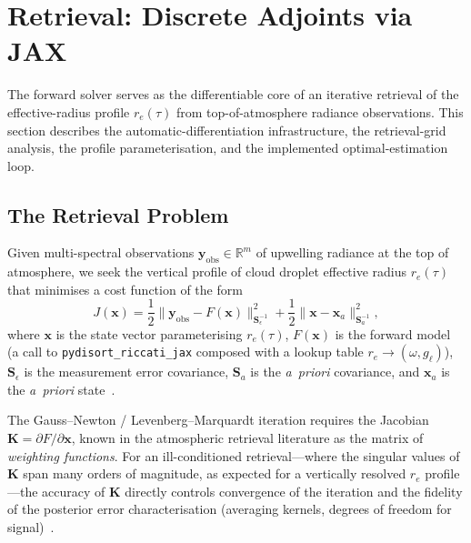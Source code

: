 \documentclass[11pt,a4paper]{article}
\newcommand{\R}{\mathbb{R}}
\newcommand{\vect}[1]{\bm{#1}}
\newcommand{\mat}[1]{\mathbf{#1}}
\theoremstyle{definition}
\begin{document}
\section{Retrieval: Discrete Adjoints via JAX}\label{sec:retrieval}

The forward solver serves as the differentiable core of an iterative
retrieval of the effective-radius profile $r_e(\tau)$ from
top-of-atmosphere radiance observations.  This section describes the
automatic-differentiation infrastructure, the retrieval-grid analysis,
the profile parameterisation, and the implemented optimal-estimation
loop.

\subsection{The Retrieval Problem}\label{sec:retrieval-problem}

Given multi-spectral observations $\vect{y}_{\mathrm{obs}} \in \R^m$ of
upwelling radiance at the top of atmosphere, we seek the vertical
profile of cloud droplet effective radius $r_e(\tau)$ that minimises a
cost function of the form
\begin{equation}\label{eq:cost}
  J(\vect{x})
  = \frac{1}{2}\bigl\|\vect{y}_{\mathrm{obs}} - F(\vect{x})\bigr\|^2_{\mat{S}_\epsilon^{-1}}
  + \frac{1}{2}\bigl\|\vect{x} - \vect{x}_a\bigr\|^2_{\mat{S}_a^{-1}},
\end{equation}
where $\vect{x}$ is the state vector parameterising $r_e(\tau)$,
$F(\vect{x})$ is the forward model (a call to
\texttt{pydisort\_riccati\_jax} composed with a lookup table
$r_e \to (\omega, g_\ell)$), $\mat{S}_\epsilon$ is the measurement
error covariance, $\mat{S}_a$ is the \emph{a~priori} covariance, and
$\vect{x}_a$ is the \emph{a~priori} state~\cite{rodgers2000}.

The Gauss--Newton / Levenberg--Marquardt iteration requires the
Jacobian $\mat{K} = \partial F / \partial \vect{x}$, known in the
atmospheric retrieval literature as the matrix of
\emph{weighting functions}.  For an ill-conditioned retrieval---where the
singular values of $\mat{K}$ span many orders of magnitude, as expected
for a vertically resolved $r_e$ profile---the accuracy of $\mat{K}$
directly controls convergence of the iteration and the fidelity of the
posterior error characterisation (averaging kernels, degrees of freedom
for signal)~\cite{rodgers2000}.
\end{document}
